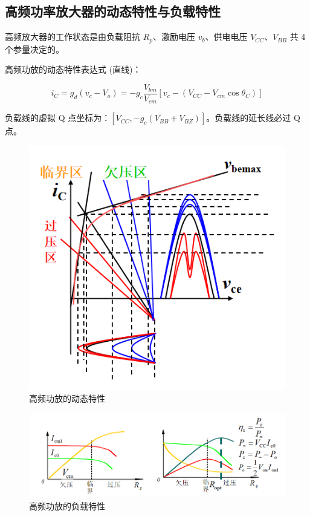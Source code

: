 \subsection{高频功率放大器的动态特性与负载特性}

高频放大器的工作状态是由负载阻抗 $R_p$、激励电压 $v_b$、供电电压 $V_{CC}$、$V_{BB}$ 共 4 个参量决定的。

高频功放的动态特性表达式 (直线)：

\begin{equation}
    i_C = g_d (v_c - V_o) 
    = - g_c \frac{V_{bm}}{V_{cm}} \left[ v_c - (V_{CC} - V_{cm} \cos{\theta_C}) \right]
\end{equation}

负载线的虚拟 Q 点坐标为：$[V_{CC}, - g_c(V_{BB} + V_{BZ})]$。负载线的延长线必过 Q 点。

\begin{figure}[htbp]
    \centering
    \includegraphics[scale=0.7]{image/Picture4.png}
    \caption{高频功放的动态特性}
\end{figure}

\begin{figure}[htbp]
    \centering
    \includegraphics[scale=0.8]{image/Picture5.png}
    \caption{高频功放的负载特性}
\end{figure}

